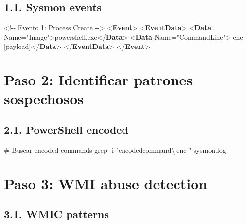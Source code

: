 \documentclass[
  letterpaper,
]{report}
\newenvironment{Shaded}{\begin{snugshade}}{\end{snugshade}}
\newcommand{\AttributeTok}[1]{\textcolor[rgb]{0.40,0.45,0.13}{#1}}
\newcommand{\CommentTok}[1]{\textcolor[rgb]{0.37,0.37,0.37}{#1}}
\newcommand{\FunctionTok}[1]{\textcolor[rgb]{0.28,0.35,0.67}{#1}}
\newcommand{\KeywordTok}[1]{\textcolor[rgb]{0.00,0.23,0.31}{\textbf{#1}}}
\newcommand{\NormalTok}[1]{\textcolor[rgb]{0.00,0.23,0.31}{#1}}
\newcommand{\OtherTok}[1]{\textcolor[rgb]{0.00,0.23,0.31}{#1}}
\newcommand{\StringTok}[1]{\textcolor[rgb]{0.13,0.47,0.30}{#1}}
\begin{document}
\subsection{1.1. Sysmon events}\label{sysmon-events}

\begin{Shaded}
\begin{Highlighting}[]
\CommentTok{\textless{}!{-}{-} Evento 1: Process Create {-}{-}\textgreater{}}
\NormalTok{\textless{}}\KeywordTok{Event}\NormalTok{\textgreater{}}
\NormalTok{  \textless{}}\KeywordTok{EventData}\NormalTok{\textgreater{}}
\NormalTok{    \textless{}}\KeywordTok{Data} \OtherTok{Name=}\StringTok{"Image"}\NormalTok{\textgreater{}powershell.exe\textless{}/}\KeywordTok{Data}\NormalTok{\textgreater{}}
\NormalTok{    \textless{}}\KeywordTok{Data} \OtherTok{Name=}\StringTok{"CommandLine"}\NormalTok{\textgreater{}{-}enc [payload]\textless{}/}\KeywordTok{Data}\NormalTok{\textgreater{}}
\NormalTok{  \textless{}/}\KeywordTok{EventData}\NormalTok{\textgreater{}}
\NormalTok{\textless{}/}\KeywordTok{Event}\NormalTok{\textgreater{}}
\end{Highlighting}
\end{Shaded}

\section{Paso 2: Identificar patrones
sospechosos}\label{paso-2-identificar-patrones-sospechosos}

\subsection{2.1. PowerShell encoded}\label{powershell-encoded}

\begin{Shaded}
\begin{Highlighting}[]
\CommentTok{\# Buscar encoded commands}
\FunctionTok{grep} \AttributeTok{{-}i} \StringTok{"encodedcommand\textbackslash{}|enc "}\NormalTok{ sysmon.log}
\end{Highlighting}
\end{Shaded}

\section{Paso 3: WMI abuse detection}\label{paso-3-wmi-abuse-detection}

\subsection{3.1. WMIC patterns}\label{wmic-patterns}
\end{document}
